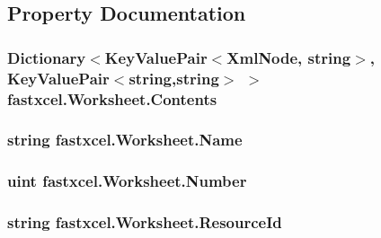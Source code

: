\subsection{Property Documentation}
\hypertarget{classfastxcel_1_1_worksheet_a77a5d8199e43fb67bae2d4e9aca2abe6}{
\subsubsection[{Contents}]{\setlength{\rightskip}{0pt plus 5cm}Dictionary$<$KeyValuePair$<$XmlNode, string$>$, KeyValuePair$<$string,string$>$ $>$ fastxcel.Worksheet.Contents}}
\label{classfastxcel_1_1_worksheet_a77a5d8199e43fb67bae2d4e9aca2abe6}
\hypertarget{classfastxcel_1_1_worksheet_a6c8e7de2303db0e0770ac05b0ad0bb1a}{
\subsubsection[{Name}]{\setlength{\rightskip}{0pt plus 5cm}string fastxcel.Worksheet.Name}}
\label{classfastxcel_1_1_worksheet_a6c8e7de2303db0e0770ac05b0ad0bb1a}
\hypertarget{classfastxcel_1_1_worksheet_a8630d6f3a0c29ad4ae7c7a158f419a02}{
\subsubsection[{Number}]{\setlength{\rightskip}{0pt plus 5cm}uint fastxcel.Worksheet.Number}}
\label{classfastxcel_1_1_worksheet_a8630d6f3a0c29ad4ae7c7a158f419a02}
\hypertarget{classfastxcel_1_1_worksheet_a232d0b0bda13403f81bdcad654cf077e}{
\subsubsection[{ResourceId}]{\setlength{\rightskip}{0pt plus 5cm}string fastxcel.Worksheet.ResourceId}}
